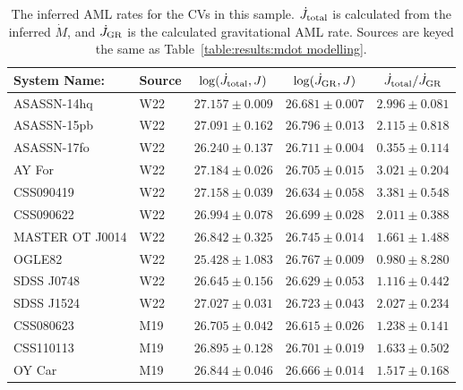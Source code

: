 \begin{table}
    \centering
    \caption{The inferred AML rates for the CVs in this sample. $\dot J_{\rm total}$ is calculated from the inferred $\dot M$, and $\dot J_{\rm GR}$ is the calculated gravitational AML rate. Sources are keyed the same as Table~\ref{table:results:mdot modelling}.}
    \label{table:results:Jdot results}
    \begin{tabular}{llccc}
        \hline
        {\bf System Name:} & \textbf{Source}  & \textbf{$\log(\dot J_{\rm total}, J)$} & \textbf{$\log(\dot J_{\rm GR}, J)$} & \textbf{$\dot J_{\rm total} / \dot J_{\rm GR}$} \\
        \hline \hline
        ASASSN-14hq     &  W22      & $27.157 \pm 0.009$    & $26.681 \pm 0.007$    & $2.996 \pm 0.081$ \\
        ASASSN-15pb     &  W22      & $27.091 \pm 0.162$    & $26.796 \pm 0.013$    & $2.115 \pm 0.818$ \\
        ASASSN-17fo     &  W22      & $26.240 \pm 0.137$    & $26.711 \pm 0.004$    & $0.355 \pm 0.114$ \\
        AY For          &  W22      & $27.184 \pm 0.026$    & $26.705 \pm 0.015$    & $3.021 \pm 0.204$ \\
        CSS090419       &  W22      & $27.158 \pm 0.039$    & $26.634 \pm 0.058$    & $3.381 \pm 0.548$ \\
        CSS090622       &  W22      & $26.994 \pm 0.078$    & $26.699 \pm 0.028$    & $2.011 \pm 0.388$ \\
        MASTER OT J0014 &  W22      & $26.842 \pm 0.325$    & $26.745 \pm 0.014$    & $1.661 \pm 1.488$ \\
        OGLE82          &  W22      & $25.428 \pm 1.083$    & $26.767 \pm 0.009$    & $0.980 \pm 8.280$ \\
        SDSS J0748      &  W22      & $26.645 \pm 0.156$    & $26.629 \pm 0.053$    & $1.116 \pm 0.442$ \\
        SDSS J1524      &  W22      & $27.027 \pm 0.031$    & $26.723 \pm 0.043$    & $2.027 \pm 0.234$ \\
        CSS080623       &  M19      & $26.705 \pm 0.042$    & $26.615 \pm 0.026$    & $1.238 \pm 0.141$ \\
        CSS110113       &  M19      & $26.895 \pm 0.128$    & $26.701 \pm 0.019$    & $1.633 \pm 0.502$ \\
        OY Car          &  M19      & $26.844 \pm 0.046$    & $26.666 \pm 0.014$    & $1.517 \pm 0.168$ \\

\end{tabular}
\end{table}
